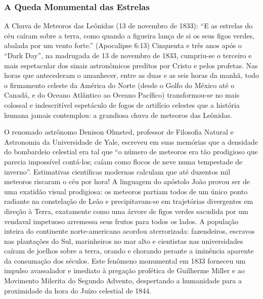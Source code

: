 \documentclass[11pt,a4paper,openany]{book}
\begin{document}
\subsubsection*{A Queda Monumental das Estrelas}
A Chuva de Meteoros das Leônidas (13 de novembro de 1833):
``E as estrelas do céu caíram sobre a terra, como quando a figueira lança de si os seus figos verdes, abalada por um vento forte.'' (Apocalipse 6:13)
Cinquenta e três anos após o ``Dark Day'', na madrugada de 13 de novembro de 1833, cumpriu-se o terceiro e mais espetacular dos sinais astronômicos preditos por Cristo e pelos profetas.
Nas horas que antecederam o amanhecer, entre as duas e as seis horas da manhã, todo o firmamento celeste da América do Norte (desde o Golfo do México até o Canadá, e do Oceano Atlântico ao Oceano Pacífico) transformou-se no mais colossal e indescritível espetáculo de fogos de artifício celestes que a história humana jamais contemplou: a grandiosa chuva de meteoros das Leônidas.

O renomado astrônomo Denison Olmsted, professor de Filosofia Natural e Astronomia da Universidade de Yale, escreveu em suas memórias que a densidade do bombardeio celestial era tal que ``o número de meteoros era tão prodigioso que parecia impossível contá-los; caíam como flocos de neve numa tempestade de inverno''. Estimativas científicas modernas calculam que até duzentos mil meteoros riscaram o céu por hora!
A linguagem do apóstolo João provou ser de uma exatidão visual prodigiosa: os meteoros partiam todos de um único ponto radiante na constelação de Leão e precipitavam-se em trajetórias divergentes em direção à Terra, exatamente como uma árvore de figos verdes sacudida por um vendaval impetuoso arremessa seus frutos para todos os lados. A população inteira do continente norte-americano acordou aterrorizada: fazendeiros, escravos nas plantações do Sul, marinheiros no mar alto e cientistas nas universidades caíram de joelhos sobre a terra, orando e chorando perante a iminência aparente da consumação dos séculos. Este fenômeno monumental em 1833 forneceu um impulso avassalador e imediato à pregação profética de Guilherme Miller e ao Movimento Milerita do Segundo Advento, despertando a humanidade para a proximidade da hora do Juízo celestial de 1844.
\end{document}
